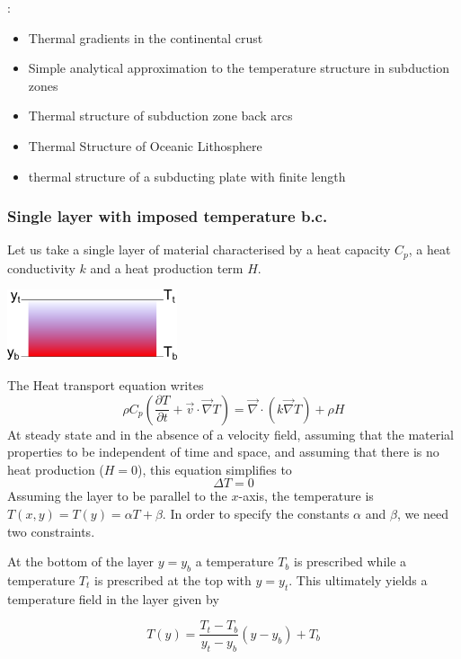 
\Literature: 
\begin{itemize}
\item
Thermal gradients in the continental crust \cite{chap86}
\item
Simple analytical approximation to the temperature structure in
subduction zones \cite{enwi04}
\item 
Thermal structure of subduction zone back arcs \cite{cuhy06}
\item 
Thermal Structure of Oceanic Lithosphere \cite{rihc18}
\item thermal structure of a subducting plate with finite length \cite{hstt90}
\end{itemize}


\subsubsection{Single layer with imposed temperature b.c.}

Let us take a single layer of material characterised by
a heat capacity $C_p$, a heat conductivity $k$
and a heat production term $H$.

\begin{center}
\includegraphics[width=5cm]{images/initial_temperature/tempcond.png}
\end{center}

The Heat transport equation writes
\begin{equation}
\rho C_p \left( \frac{\partial T}{\partial t} + {\vec v} \cdot {\vec \nabla} { T} \right) = 
{\vec \nabla} \cdot (k {\vec \nabla} T) + \rho H
\end{equation}
At steady state and in the absence of a velocity field, assuming
that the material properties to be independent of time and space, and 
assuming that
there is no heat production ($H=0$), this equation
simplifies to
\begin{equation}
\Delta T =0 
\end{equation}
Assuming the layer to be parallel to the $x$-axis, the temperature is
$T(x,y)=T(y)=\alpha T+ \beta$. 
In order to specify the constants $\alpha$ and $\beta$, we need two constraints.

At the bottom of the layer $y=y_b$ a temperature $T_b$ is prescribed while a temperature
$T_t$ is prescribed at the top with $y=y_t$. This ultimately yields a temperature field in
the layer given by
\begin{mdframed}[backgroundcolor=blue!5]
\[
T(y) = \frac{T_t-T_b}{y_t-y_b}(y-y_b) + T_b
\]
\end{mdframed}

